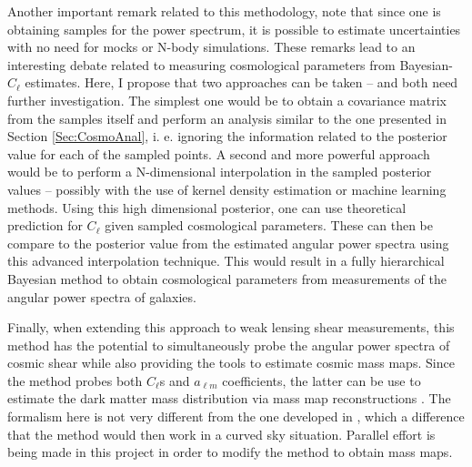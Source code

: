 \qquad Another important remark related to this methodology, note that since one is obtaining samples for the power spectrum, it is possible to estimate uncertainties with no need for mocks or N-body simulations. These remarks lead to an interesting debate related to measuring cosmological parameters from Bayesian-$C_{\ell}$ estimates. Here, I propose that two approaches can be taken -- and both need further investigation. The simplest one would be to obtain a covariance matrix from the samples itself and perform an analysis similar to the one presented in Section \ref{Sec:CosmoAnal}, i. e. ignoring the information related to the posterior value for each of the sampled points. A second and more powerful approach would be to perform a N-dimensional interpolation in the sampled posterior values -- possibly with the use of kernel density estimation or machine learning methods. Using this high dimensional posterior, one can use theoretical prediction for $C_{\ell}$ given sampled cosmological parameters. These can then be compare to the posterior value from the estimated angular power spectra using this advanced interpolation technique. This would result in a fully hierarchical Bayesian method to obtain cosmological parameters from measurements of the angular power spectra of galaxies. 

\qquad Finally, when extending this approach to weak lensing shear measurements, this method has the potential to simultaneously probe the angular power spectra of cosmic shear while also providing the tools to estimate cosmic mass maps. Since the method probes both $C_{\ell}$s and $a_{\ell m}$ coefficients, the latter can be use to estimate the dark matter mass distribution via mass map reconstructions \citep{2018Niall}. The formalism here is not very different from the one developed in \cite{AlmostBlackPearl2016}, which a difference that the method would then work in a curved sky situation. Parallel effort is being made in this project in order to modify the method to obtain mass maps.